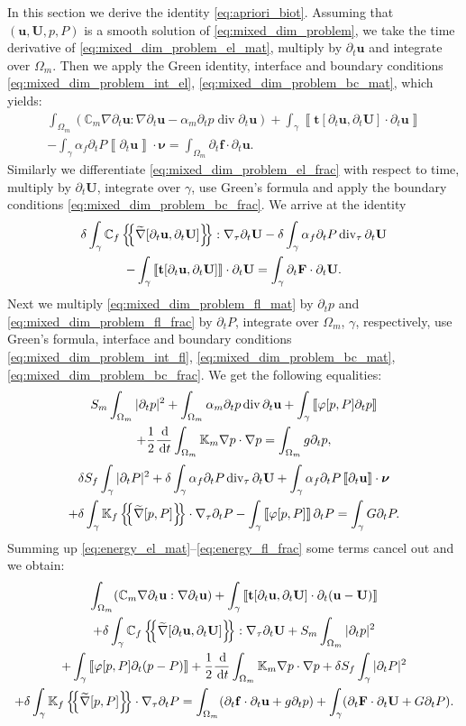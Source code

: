 \documentclass[a4paper]{article}
\numberwithin{equation}{section}
\def\agrad{\widetilde\nabla}
\def\avg#1{\left\{\mskip-5mu\left\{#1\right\}\mskip-5mu\right\}}
\def\CC{\tn C}
\def\d {\,{\rm d}}
\def\ddt#1{\frac{\d #1}{\d t}}
\def\div{\operatorname{div}}
\def\dt{\prtl_t}
\def\FF{\vc F}
\def\ff{\vc f}
\def\jmp#1{\left\llbracket #1 \right\rrbracket}
\def\nnu{\boldsymbol\nu}
\def\prtl{\partial}
\def\tn#1{{\mathbb{#1}}}    %
\def\ttraction{\vc t}
\def\U{\vc U}
\def\uu{\vc u}
\def\vc#1{\mathbf{#1}}     %
\newcommand{\ml}[1]{\begin{multline}#1\end{multline}}
\begin{document}
In this section we derive the identity \eqref{eq:apriori_biot}.
Assuming that $(\uu,\U,p,P)$ is a smooth solution of \eqref{eq:mixed_dim_problem}, we take the time derivative of \eqref{eq:mixed_dim_problem_el_mat}, multiply by $\dt\uu$ and integrate over $\Omega_m$.
Then we apply the Green identity, interface and boundary conditions \eqref{eq:mixed_dim_problem_int_el}, \eqref{eq:mixed_dim_problem_bc_mat}, which yields:
\ml{ \label{eq:energy_el_mat} \int_{\Omega_m}(\CC_m\nabla\dt\uu:\nabla\dt\uu - \alpha_m\dt p \div\dt\uu) + \int_\gamma\jmp{\ttraction[\dt\uu,\dt\U]\cdot\dt\uu}\\
- \int_\gamma\alpha_f\dt P\jmp{\dt\uu}\cdot\nnu
= \int_{\Omega_m}\dt\ff\cdot\dt\uu. }
Similarly we differentiate \eqref{eq:mixed_dim_problem_el_frac} with respect to time, multiply by $\dt\U$, integrate over $\gamma$, use Green's formula and apply the boundary conditions \eqref{eq:mixed_dim_problem_bc_frac}.
We arrive at the identity
\ml{ \label{eq:energy_el_frac} \delta\int_\gamma\CC_f\avg{\agrad[\dt\uu,\dt\U]}:\nabla_\tau\dt\U - \delta\int_\gamma\alpha_f\dt P\div_\tau\dt\U\\
- \int_\gamma\jmp{\ttraction[\dt\uu,\dt\U]}\cdot\dt\U = \int_\gamma\dt\FF\cdot\dt\U. }
Next we multiply \eqref{eq:mixed_dim_problem_fl_mat} by $\dt p$ and \eqref{eq:mixed_dim_problem_fl_frac} by $\dt P$, integrate over $\Omega_m$, $\gamma$, respectively, use Green's formula, interface and boundary conditions \eqref{eq:mixed_dim_problem_int_fl}, \eqref{eq:mixed_dim_problem_bc_mat}, \eqref{eq:mixed_dim_problem_bc_frac}.
We get the following equalities:
\ml{ \label{eq:energy_fl_mat} S_m\int_{\Omega_m}|\dt p|^2 + \int_{\Omega_m}\alpha_m\dt p\div\dt\uu + \int_\gamma\jmp{\varphi[p,P]\dt p}\\
+ \frac12\ddt{}\int_{\Omega_m}\tn K_m\nabla p\cdot\nabla p
= \int_{\Omega_m}g \dt p, }
\ml{ \label{eq:energy_fl_frac} \delta S_f\int_\gamma|\dt P|^2 + \delta\int_\gamma\alpha_f\dt P\div_\tau\dt\U + \int_\gamma\alpha_f\dt P\jmp{\dt\uu}\cdot\nnu\\
+ \delta\int_\gamma\tn K_f\avg{\agrad[p,P]}\cdot\nabla_\tau\dt P 
- \int_\gamma\jmp{\varphi[p,P]}\dt P = \int_\gamma G \dt P. }
Summing up \eqref{eq:energy_el_mat}--\eqref{eq:energy_fl_frac} some terms cancel out and we obtain:
\ml{ \label{eq:energy_sum} \int_{\Omega_m}(\CC_m\nabla\dt\uu:\nabla\dt\uu ) + \int_\gamma\jmp{\ttraction[\dt\uu,\dt\U]\cdot\dt(\uu-\U)}\\
+ \delta\int_\gamma\CC_f\avg{\agrad[\dt\uu,\dt\U]}:\nabla_\tau\dt\U
+ S_m\int_{\Omega_m}|\dt p|^2\\
+ \int_\gamma\jmp{\varphi[p,P]\dt(p-P)}
+ \frac12\ddt{}\int_{\Omega_m}\tn K_m\nabla p\cdot\nabla p
+ \delta S_f\int_\gamma|\dt P|^2
\\
+ \delta\int_\gamma\tn K_f\avg{\agrad[p,P]}\cdot\nabla_\tau\dt P 
= \int_{\Omega_m}(\dt\ff\cdot\dt\uu + g \dt p) + \int_\gamma(\dt\FF\cdot\dt\U + G \dt P). }
\end{document}
